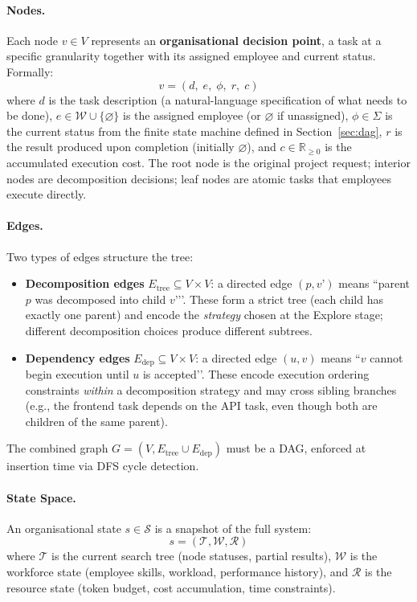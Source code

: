 \documentclass[11pt,a4paper]{article}
\begin{document}
\paragraph{Nodes.}
Each node $v \in V$ represents an \textbf{organisational decision point}, a task at a specific granularity together with its assigned employee and current status.  Formally:
\begin{equation}
v = (d,\; e,\; \phi,\; r,\; c)
\end{equation}
where $d$ is the task description (a natural-language specification of what needs to be done), $e \in \mathcal{W} \cup \{\varnothing\}$ is the assigned employee (or $\varnothing$ if unassigned), $\phi \in \Sigma$ is the current status from the finite state machine defined in Section~\ref{sec:dag}, $r$ is the result produced upon completion (initially $\varnothing$), and $c \in \mathbb{R}_{\geq 0}$ is the accumulated execution cost.  The root node is the original project request; interior nodes are decomposition decisions; leaf nodes are atomic tasks that employees execute directly.

\paragraph{Edges.}
Two types of edges structure the tree:
\begin{itemize}[nosep]
    \item \textbf{Decomposition edges} $E_{\text{tree}} \subseteq V \times V$: a directed edge $(p, v’)$ means ``parent $p$ was decomposed into child $v’$’’.  These form a strict tree (each child has exactly one parent) and encode the \emph{strategy} chosen at the Explore stage; different decomposition choices produce different subtrees.
    \item \textbf{Dependency edges} $E_{\text{dep}} \subseteq V \times V$: a directed edge $(u, v)$ means ``$v$ cannot begin execution until $u$ is accepted’’.  These encode execution ordering constraints \emph{within} a decomposition strategy and may cross sibling branches (e.g., the frontend task depends on the API task, even though both are children of the same parent).
\end{itemize}
The combined graph $G = (V, E_{\text{tree}} \cup E_{\text{dep}})$ must be a DAG, enforced at insertion time via DFS cycle detection.

\paragraph{State Space.}
An organisational state $s \in \mathcal{S}$ is a snapshot of the full system:
\begin{equation}
s = (\mathcal{T}, \mathcal{W}, \mathcal{R})
\end{equation}
where $\mathcal{T}$ is the current search tree (node statuses, partial results), $\mathcal{W}$ is the workforce state (employee skills, workload, performance history), and $\mathcal{R}$ is the resource state (token budget, cost accumulation, time constraints).
\end{document}
